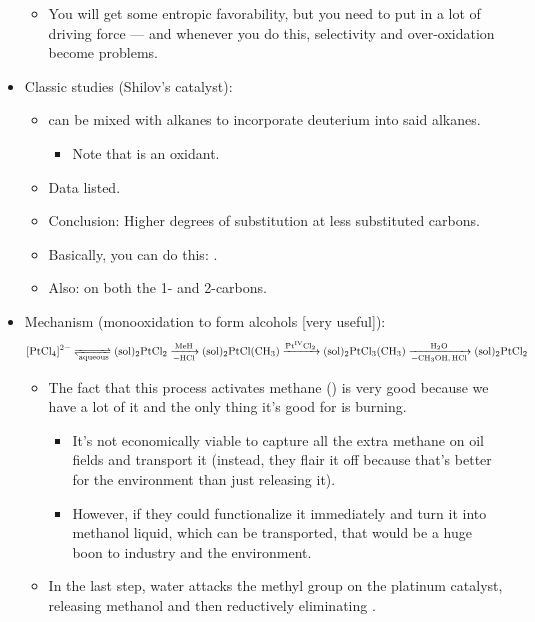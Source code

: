 \documentclass[../notes.tex]{subfiles}
\begin{document}
\begin{itemize}
\begin{itemize}
        \item You will get some entropic favorability, but you need to put in a lot of driving force --- and whenever you do this, selectivity and over-oxidation become problems.
    \end{itemize}
    \item Classic studies (Shilov's catalyst):
    \begin{itemize}
        \item {} can be mixed with alkanes to incorporate deuterium into said alkanes.
        \begin{itemize}
            \item Note that  is an oxidant.
        \end{itemize}
        \item Data listed.
        \item Conclusion: Higher degrees of substitution at less substituted carbons.
        \item Basically, you can do this: .
        \item Also:  on both the 1- and 2-carbons.
    \end{itemize}
    \item Mechanism (monooxidation to form alcohols [very useful]):
    \begin{equation*}
        \ce{[PtCl4]^2- <=>[][{aqueous}] ({sol})2PtCl2 ->[MeH][-HCl] ({sol})2PtCl(CH3) ->[Pt^{IV}Cl2] ({sol})2PtCl3(CH3) ->[H2O][-CH3OH, HCl] ({sol})2PtCl2}
    \end{equation*}
    \begin{itemize}
        \item The fact that this process activates methane () is very good because we have a lot of it and the only thing it's good for is burning.
        \begin{itemize}
            \item It's not economically viable to capture all the extra methane on oil fields and transport it (instead, they flair it off because that's better for the environment than just releasing it).
            \item However, if they could functionalize it immediately and turn it into methanol liquid, which can be transported, that would be a huge boon to industry and the environment.
        \end{itemize}
        \item In the last step, water attacks the methyl group on the platinum catalyst, releasing methanol and then reductively eliminating .

\end{itemize}
\end{itemize}
\end{document}
